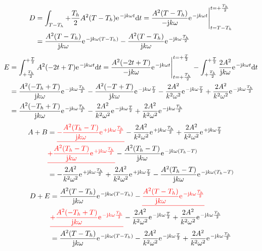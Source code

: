 \documentclass[11pt,a4paper,DIV=12]{scrartcl}
\begin{document}
%
%
%
\begin{align}
	D&=\int_{T-T_h}{+\frac{T_h}{2}}A^2(T-T_h)\e^{-\im k \omega t}\diff t=\frac{A^2(T-T_h)}{-\im k \omega}\e^{-\im k \omega t}\Bigg |_{t=T-T_h}^{t=+\frac{T_h}{2}}\nonumber \\
	&=\frac{A^2(T-T_h)}{\im k \omega}\e^{-\im k \omega(T-T_h)}-\frac{A^2(T-T_h)}{\im k \omega}\e^{-\im k \omega \frac{T_h}{2}}
\end{align}
%
%
%
\begin{align}
	E&=\int_{+\frac{T_h}{2}}^{+\frac{T}{2}}A^2(-2t+T)\e^{-\im k \omega t}\diff t=\frac{A^2(-2t+T)}{-\im k \omega }\e^{-\im k \omega t}\Bigg |_{t=+\frac{T_h}{2}}^{t=+\frac{T}{2}}-\int_{+\frac{T_h}{2}}^{+\frac{T}{2}}\frac{2A^2}{\im k \omega}\e^{-\im k \omega t}\diff t\nonumber \\
	&=\frac{A^2(-T_h+T)}{\im k \omega}\e^{-\im k \omega \frac{T_h}{2}}-\frac{A^2(-T+T)}{\im k \omega}\e^{-\im k \omega \frac{T}{2}}-\frac{2A^2}{k^2\omega^2}\e^{-\im k \omega \frac{T}{2}}+\frac{2A^2}{k^2\omega^2}\e^{-\im k \omega \frac{T_h}{2}}\nonumber \\
	&=\frac{A^2(-T_h+T)}{\im k \omega}\e^{-\im k\omega \frac{T_h}{2}}-\frac{2A^2}{k^2\omega^2}\e^{-\im k \omega \frac{T}{2}}+\frac{2A^2}{k^2\omega^2}\e^{-\im k \omega \frac{T_h}{2}}
\end{align}
%
%
%
\begin{align}
	A+B&=\ured{-\frac{A^2(T_h-T)}{\im k \omega}\e^{+\im k \omega \frac{T_h}{2}}}-\frac{2A^2}{k^2\omega^2}\e^{+\im k \omega \frac{T_h}{2}}+\frac{2A^2}{k^2\omega^2}\e^{+\im k \omega \frac{T}{2}}\nonumber \\
	&\ured{+\frac{A^2(T_h-T)}{\im k \omega}\e^{+\im k \omega \frac{T_h}{2}}}-\frac{A^2(T_h-T)}{\im k \omega}\e^{-\im k \omega (T_h-T)}\nonumber \\
	&=-\frac{2A^2}{k^2\omega^2}\e^{+\im k \omega \frac{T_h}{2}}+\frac{2A^2}{k^2\omega^2}\e^{+\im k \omega \frac{T}{2}}-\frac{A^2(T_h-T)}{\im k \omega}\e^{-\im k \omega (T_h-T)}
\end{align}
%
%
%
\begin{align}
	D+E&=\frac{A^2(T-T_h)}{\im k \omega}\e^{-\im k \omega(T-T_h)}-\ured{\frac{A^2(T-T_h)}{\im k \omega}\e^{-\im k \omega \frac{T_h}{2}}}\nonumber \\
	&\ured{+\frac{A^2(-T_h+T)}{\im k \omega}\e^{-\im k\omega \frac{T_h}{2}}}-\frac{2A^2}{k^2\omega^2}\e^{-\im k \omega \frac{T}{2}}+\frac{2A^2}{k^2\omega^2}\e^{-\im k \omega \frac{T_h}{2}}\nonumber \\
	&=\frac{A^2(T-T_h)}{\im k \omega}\e^{-\im k \omega(T-T_h)}-\frac{2A^2}{k^2\omega^2}\e^{-\im k \omega \frac{T}{2}}+\frac{2A^2}{k^2\omega^2}\e^{-\im k \omega \frac{T_h}{2}}
\end{align}
\end{document}
